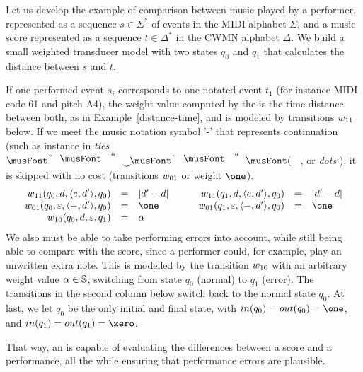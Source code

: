 \begin{example}
Let us develop the example of comparison between music played by a performer,
represented as a sequence $s \in \Sigma^*$ of events in the MIDI alphabet $\Sigma$,
and  a music score represented as a sequence $t \in \Delta^*$
in the CWMN alphabet $\Delta$. We build a small weighted transducer model
 with two states $q_0$ and $q_1$ that
calculates the distance between $s$ and $t$.

If one performed event $s_i$  corresponds
to one notated event $t_1$ (for instance MIDI code 61 and pitch A4),
the weight value computed by the \SWT is the time distance between both,
as in Example~\ref{distance-time}, and is modeled by
transitions $\wei_{11}$ below.
%
If we meet the music notation symbol '-' that
represents continuation (such as instance in \emph{ties}
$\musQuarter\!\!\!\mathrel{\raisebox{-1.5mm}{$\smile$}}\!\!\!\musEighth$,
or \emph{dots} \musQuarterDotted{}), it is  skipped with no cost (transitions $\wei_{01}$ or weight $\one$).
\[
\begin{array}{rclcrcl}
\wei_{11}(q_0, d, \< \mathsf{e}, d'>, q_0) & = & |d' - d| & \quad &
\wei_{11}(q_1, d, \< \mathsf{e}, d'>, q_0) & = & |d' - d|\\
\wei_{01}(q_0, \varepsilon, \< \mathsf{-}, d'>, q_0) & = & \one & &
\wei_{01}(q_1, \varepsilon, \< \mathsf{-}, d'>, q_0) & = & \one\\
\wei_{10}(q_0, d, \varepsilon, q_1) & = & \alpha & & %
\end{array}
\]
%
We also must be able to take performing errors into account, while still being able to compare with the score,
since a performer could, for example, play an unwritten extra note.
%
This is modelled by the transition $\wei_{10}$ with an arbitrary weight value $\alpha \in \mathbb{S}$,
switching from state $q_0$ (normal) to $q_1$ (error).
The transitions in the second column below switch back to the normal state $q_0$.
At last, we let $q_0$ be the only initial and final state, with
$\init(q_0) = \final(q_0) = \one$, and
$\init(q_1) = \final(q_1) = \zero$.

That way, an \SWT is capable of evaluating the differences between a score and a performance,
all the while ensuring that performance errors are plausible.
\endex
\end{example}


